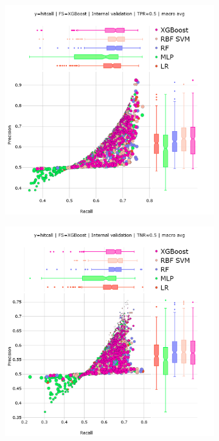 \begin{figure}
\centering
\begin{subfigure}[b]{0.495\textwidth}
  \centering
  \includegraphics[width=\textwidth]{generated_results/hitcall_classification_Feature_Selection_XGBClassifier_val_tpr_macro_avg.png}
  \caption{}
\label{fig:hitcall_classification_Feature_Selection_XGBClassifier_val_tpr_macro_avg}
\end{subfigure}
\hfill
\begin{subfigure}[b]{0.495\textwidth}
  \centering
  \includegraphics[width=\textwidth]{generated_results/hitcall_classification_Feature_Selection_XGBClassifier_val_tnr_macro_avg.png}

\end{subfigure}
\end{figure}
